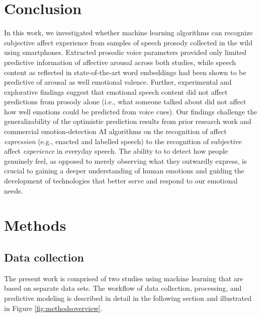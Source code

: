 \documentclass[
  english,
  man,floatsintext]{apa6}
\begin{document}
\hypertarget{conclusion}{%
\section{Conclusion}\label{conclusion}}

In this work, we investigated whether machine learning algorithms can recognize subjective affect experience from samples of speech prosody collected in the wild using smartphones. Extracted prosodic voice parameters provided only limited predictive information of affective arousal across both studies, while speech content as reflected in state-of-the-art word embeddings had been shown to be predictive of arousal as well emotional valence. Further, experimental and explorative findings suggest that emotional speech content did not affect predictions from prosody alone (i.e., what someone talked about did not affect how well emotions could be predicted from voice cues). Our findings challenge the generalizability of the optimistic prediction results from prior research work and commercial emotion-detection AI algorithms on the recognition of affect \emph{expression} (e.g., enacted and labelled speech) to the recognition of subjective affect \emph{experience} in everyday speech. The ability to to detect how people genuinely feel, as opposed to merely observing what they outwardly express, is crucial to gaining a deeper understanding of human emotions and guiding the development of technologies that better serve and respond to our emotional needs.

\hypertarget{methods}{%
\section{Methods}\label{methods}}

\hypertarget{data-collection}{%
\subsection{Data collection}\label{data-collection}}

The present work is comprised of two studies using machine learning that are based on separate data sets. The workflow of data collection, processing, and predictive modeling is described in detail in the following section and illustrated in Figure \ref{fig:methodsoverview}.
\end{document}
